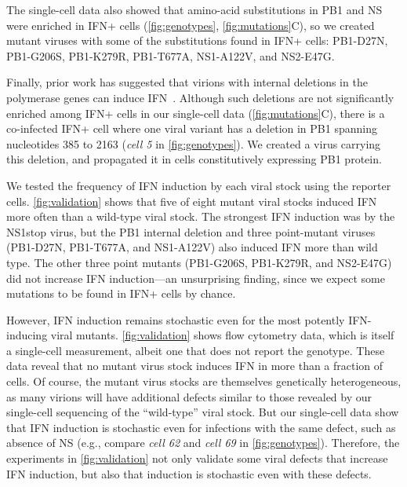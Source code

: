 \documentclass[10pt,letterpaper]{article}
\newcommand{\FIG}[1]{\autoref{fig:#1}}
\begin{document}
The single-cell data also showed that amino-acid substitutions in PB1 and NS were enriched in IFN+ cells (\FIG{genotypes}, \FIG{mutations}C), so we created mutant viruses with some of the substitutions found in IFN+ cells: PB1-D27N, PB1-G206S, PB1-K279R, PB1-T677A, NS1-A122V, and NS2-E47G.

Finally, prior work has suggested that virions with internal deletions in the polymerase genes can induce IFN~\citep{baum2010preference, tapia2013defective, boergeling2015evidence, dimmock2015cloned}.
Although such deletions are not significantly enriched among IFN+ cells in our single-cell data (\FIG{mutations}C), there is a co-infected IFN+ cell where one viral variant has a deletion in PB1 spanning nucleotides 385 to 2163 (\textit{cell 5} in \FIG{genotypes}).
We created a virus carrying this deletion, and propagated it in cells constitutively expressing PB1 protein.

We tested the frequency of IFN induction by each viral stock using the reporter cells.
\FIG{validation} shows that five of eight mutant viral stocks induced IFN more often than a wild-type viral stock.
The strongest IFN induction was by the NS1stop virus, but the PB1 internal deletion and three point-mutant viruses (PB1-D27N, PB1-T677A, and NS1-A122V) also induced IFN more than wild type.
The other three point mutants (PB1-G206S, PB1-K279R, and NS2-E47G) did not increase IFN induction---an unsurprising finding, since we expect some mutations to be found in IFN+ cells by chance.

However, IFN induction remains stochastic even for the most potently IFN-inducing viral mutants.
\FIG{validation} shows flow cytometry data, which is itself a single-cell measurement, albeit one that does not report the genotype.
These data reveal that no mutant virus stock induces IFN in more than a fraction of cells.
Of course, the mutant virus stocks are themselves genetically heterogeneous, as many virions will have additional defects similar to those revealed by our single-cell sequencing of the ``wild-type'' viral stock.
But our single-cell data show that IFN induction is stochastic even for infections with the same defect, such as absence of NS (e.g., compare \textit{cell 62} and \textit{cell 69} in \FIG{genotypes}).
Therefore, the experiments in \FIG{validation} not only validate some viral defects that increase IFN induction, but also that induction is stochastic even with these defects.
\end{document}
